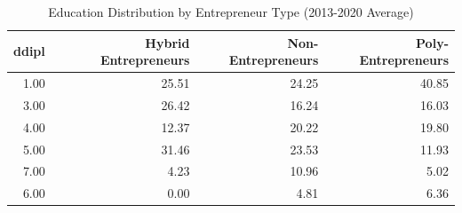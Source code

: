 \begin{table}[ht]
\centering
\caption{Education Distribution by Entrepreneur Type (2013-2020 Average)} 
\label{tab:characteristics_education_avg}
\begin{tabular}{rrrr}
  \toprule
ddipl & Hybrid Entrepreneurs & Non-Entrepreneurs & Poly-Entrepreneurs \\ 
  \midrule
1.00 & 25.51 & 24.25 & 40.85 \\ 
  3.00 & 26.42 & 16.24 & 16.03 \\ 
  4.00 & 12.37 & 20.22 & 19.80 \\ 
  5.00 & 31.46 & 23.53 & 11.93 \\ 
  7.00 & 4.23 & 10.96 & 5.02 \\ 
  6.00 & 0.00 & 4.81 & 6.36 \\ 
   \bottomrule
\end{tabular}
\end{table}
